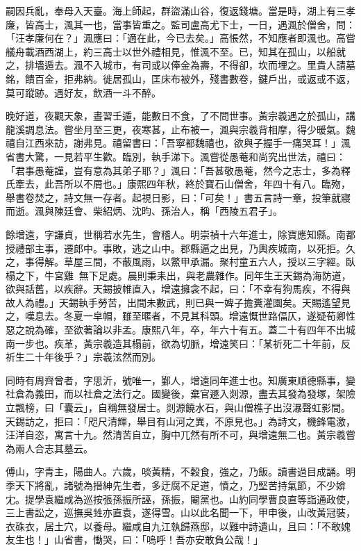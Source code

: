 \begin{pinyinscope}
嗣因兵亂，奉母入天臺。海上師起，群盜滿山谷，復返錢塘。當是時，湖上有三孝廉，皆高士，渢其一也，當事皆重之。監司盧高尤下士，一日，遇渢於僧舍，問：「汪孝廉何在？」渢應曰：「適在此，今已去矣。」高悵然，不知應者即渢也。高嘗艤舟載酒西湖上，約三高士以世外禮相見，惟渢不至。已，知其在孤山，以船就之，排墻遁去。渢不入城市，有司或以俸金為壽，不得卻，坎而埋之。里貴人請墓銘，饋百金，拒弗納。徙居孤山，匡床布被外，殘書數卷，鍵戶出，或返或不返，莫可蹤跡。遇好友，飲酒一斗不醉。

晚好道，夜觀天象，晝習壬遁，能數日不食，了不問世事。黃宗羲遇之於孤山，講龍溪調息法。嘗坐月至三更，夜寒甚，止布被一，渢與宗羲背相摩，得少暖氣。魏禧自江西來訪，謝弗見。禧留書曰：「吾寧都魏禧也，欲與子握手一痛哭耳！」渢省書大驚，一見若平生歡。臨別，執手涕下。渢嘗從愚菴和尚究出世法，禧曰：「君事愚菴謹，豈有意為其弟子耶？」渢曰：「吾甚敬愚菴，然今之志士，多為釋氏牽去，此吾所以不屑也。」康熙四年秋，終於寶石山僧舍，年四十有八。臨歾，舉書卷焚之，詩文無一存者。起視日影，曰：「可矣！」書五言詩一章，投筆就寢而逝。渢與陳廷會、柴紹炳、沈昀、孫治人，稱「西陵五君子」。

餘增遠，字謙貞，世稱若水先生，會稽人。明崇禎十六年進士，除寶應知縣。南都授禮部主事，遷郎中。事敗，逃之山中。郡縣逼之出見，乃輿疾城南，以死拒。久之，事得解。草屋三間，不蔽風雨，以鱉甲承漏。聚村童五六人，授以三字經。臥榻之下，牛宮雞，無下足處。晨則秉耒出，與老農雜作。同年生王天錫為海防道，欲與話舊，以疾辭。天錫披帷直入，增遠擁衾不起，曰：「不幸有狗馬疾，不得與故人為禮。」天錫執手勞苦，出間未數武，則已與一婢子擔糞灌園矣。天賜遙望見之，嘆息去。冬夏一皁帽，雖至暱者，不見其科頭。增遠慨世路偪仄，遂疑荀卿性惡之說為確，至欲著論以非孟。康熙八年，卒，年六十有五。蓋二十有四年不出城南一步也。疾革，黃宗羲造其榻前，欲為切脈，增遠笑曰：「某祈死二十年前，反祈生二十年後乎？」宗羲泫然而別。

同時有周齊曾者，字思沂，號唯一，鄞人，增遠同年進士也。知廣東順德縣事，變社倉為義田，而以社倉之法行之。國變後，棄官遯入剡源，盡去其發為發塚，架險立飄榜，曰「囊云」，自稱無發居士。剡源饒水石，與山僧樵子出沒瀑聲虹影間。天錫訪之，拒曰：「咫尺清輝，舉目有山河之異，不原見也。」為詩文，機鋒電激，汪洋自恣，寓言十九。然清苦自立，胸中兀然有所不可，與增遠無二也。黃宗羲嘗為兩人合志其墓云。

傅山，字青主，陽曲人。六歲，啖黃精，不穀食，強之，乃飯。讀書過目成誦。明季天下將亂，諸號為搢紳先生者，多迂腐不足道，憤之，乃堅苦持氣節，不少媕冘。提學袁繼咸為巡按張孫振所誣，孫振，閹黨也。山約同學曹良直等詣通政使，三上書訟之，巡撫吳甡亦直袁，遂得雪。山以此名聞一下，甲申後，山改黃冠裝，衣硃衣，居土穴，以養母。繼咸自九江執歸燕邸，以難中詩遺山，且曰：「不敢媿友生也！」山省書，慟哭，曰：「嗚呼！吾亦安敢負公哉！」


\end{pinyinscope}
